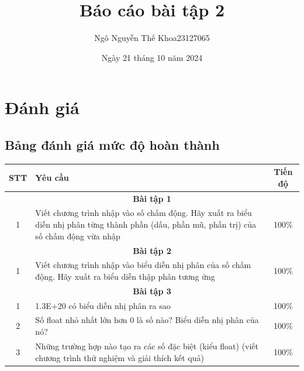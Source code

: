 \documentclass[a4paper,12pt]{report}
\title{Báo cáo bài tập 2}
\author{\begin{tabular}{r c}
  Ngô Nguyễn Thế Khoa & 23127065
  \end{tabular}}
\date{Ngày 21 tháng 10 năm 2024}
\begin{document}

\tableofcontents\thispagestyle{empty}

\pagebreak
\section{Đánh giá}
\subsection*{Bảng đánh giá mức độ hoàn thành}
\begin{center}
	\renewcommand{\arraystretch}{1.5}
	\begin{tabular}{|c|p{}|c|}
		\hline
		\textbf{STT} & \textbf{Yêu cầu}                                                                                                                           & \textbf{Tiến độ} \\\hline
		\multicolumn{3}{|c|}{\textbf{Bài tập 1}}                                                                                                                                     \\\hline
		1            & Viết chương trình nhập vào số chấm động. Hãy xuất ra biểu diễn nhị phân từng thành phần (dấu, phần mũ, phần trị) của số chấm động vừa nhập & 100\%            \\\hline
		\multicolumn{3}{|c|}{\textbf{Bài tập 2}}                                                                                                                                     \\\hline
		1            & Viết chương trình nhập vào biểu diễn nhị phân của số chấm động. Hãy xuất ra biểu diễn thập phân tương ứng                                  & 100\%            \\\hline
		\multicolumn{3}{|c|}{\textbf{Bài tập 3}}                                                                                                                                     \\\hline
		1            & 1.3E+20 có biểu diễn nhị phân ra sao                                                                                                       & 100\%            \\\hline
		2            & Số float nhỏ nhất lớn hơn 0 là số nào? Biểu diễn nhị phân của nó?                                                                          & 100\%            \\\hline
		3            & Những trường hợp nào tạo ra các số đặc biệt (kiểu float) (viết chương trình thử nghiệm và giải thích kết quả)                              & 100\%            \\\hline

\end{tabular}
\end{center}
\end{document}
